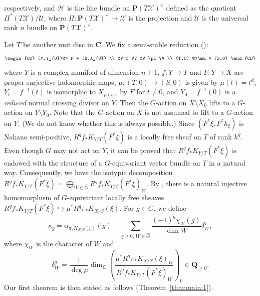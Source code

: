 \documentclass[amscd, leqno]{amsart}
\theoremstyle{plain}
\theoremstyle{definition}
\theoremstyle{remark}
\begin{document}
respectively, and ${\mathcal H}$ is the line bundle on ${\mathbf P}(T{\mathcal X})^{\lor}$ defined as the quotient 
$\varPi^{*}(T{\mathcal X})/{\mathcal U}$, where $\varPi \colon {\mathbf P}(T{\mathcal X})^{\lor} \to {\mathcal X}$ is the projection 
and ${\mathcal U}$ is the universal rank $n$ bundle on ${\mathbf P}(T{\mathcal X})^{\lor}$. 
\par
Let $T$ be another unit disc in ${\mathbf C}$. We fix a semi-stable reduction (\cite{Mumford73}): 
$$
\begin{CD}
(Y,Y_{0})@> F >>  (X,X_{0})
\\
@V f VV  @V \pi VV
\\
(T,0) @>\mu>> (S,0)
\end{CD}
$$
where $Y$ is a complex manifold of dimension $n+1$, $f \colon Y \to T$ and $F \colon Y \to X$ are proper surjective holomorphic maps, 
$\mu\colon(T,0)\to(S,0)$ is given by $\mu(t)=t^{d}$, $Y_{t}=f^{-1}(t)$ is isomorphic to $X_{\mu(t)}$ by $F$ for $t \not=0$, 
and $Y_{0}=f^{-1}(0)$ is a {\em reduced} normal crossing divisor on $Y$. 
Then the $G$-action on $X\setminus X_{0}$ lifts to a $G$-action on $Y \setminus Y_{0}$.
Note that the $G$-action on $X$ is not assumed to lift to a $G$-action on $Y$. (We do not know whether this is always possible.)
Since $(F^{*}\xi, F^{*}h_{\xi})$ is Nakano semi-positive, $R^{q}f_{*}K_{Y/T}(F^{*}\xi)$ is a locally free sheaf on $T$ of rank $h^{q}$. 
Even though $G$ may not act on $Y$, it can be proved that $R^{q}f_{*}K_{Y/T}(F^{*}\xi)$ is endowed with the structure of a $G$-equivariant 
vector bundle on $T$ in a natural way. Consequently, we have the isotypic decomposition 
$R^{q}f_{*}K_{Y/T}(F^{*}\xi) = \bigoplus_{W\in\widehat{G}} R^{q}f_{*}K_{Y/T}(F^{*}\xi)_{W}$.
By \cite{MourouganeTakayama09}, there is a natural injective homomorphism of $G$-equivariant locally free sheaves
$R^{q}f_{*}K_{Y/T}(F^{*}\xi) \hookrightarrow \mu^{*}R^{q}\pi_{*}K_{X/S}(\xi)$. For $g \in G$, we define 
$$
\kappa_{g} = \alpha_{\pi, K_{X/S}(\xi)}(g) - \sum_{q \geq 0,\, W \in \widehat{G}} \frac{(-1)^{q} \chi_{W}(g)}{\dim W} \delta_{W}^{q},
$$
where $\chi_{W}$ is the character of $W$ and
$$
\delta_{W}^{q}
=
\frac{1}{\deg \mu} \dim_{\mathbf C} \left( \frac{\mu^{*}R^{q}\pi_{*} K_{X/S}(\xi)_{W}}{R^{q}f_{*} K_{Y/T}(F^{*}\xi)_{W}} \right)_{0}
\in {\mathbf Q}_{\geq0}.
$$
Our first theorem is then stated as follows (Theorem~\ref{thm:main:1}).
\end{document}
